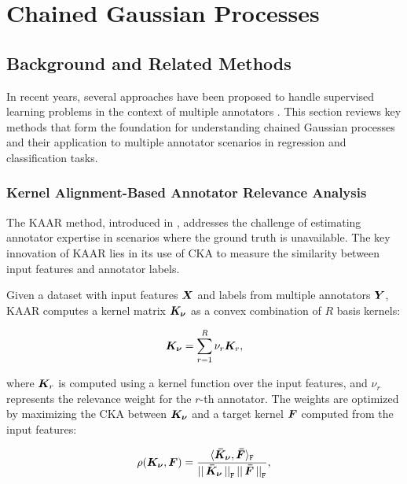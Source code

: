\chapter{Chained Gaussian Processes}\label{ch:chained_gps}

\section{Background and Related Methods}\label{sec:background}

In recent years, several approaches have been proposed to handle
supervised learning problems in the context of multiple annotators
\cite{Yan2014} \cite{Zhang2022}.
This section reviews key methods that form the foundation for
understanding chained Gaussian processes and their application to
multiple annotator scenarios in regression and classification tasks.

\subsection{Kernel Alignment-Based Annotator Relevance Analysis}

The \gls{KAAR} method, introduced in \cite{GilGonzalezEtAl2018},
addresses the challenge of estimating annotator expertise in
scenarios where the ground truth is unavailable. The key innovation
of \gls{KAAR} lies in its use of \gls{CKA} to measure the similarity
between input features and annotator labels.

Given a dataset with input features ${\bm{X}}$ and labels from
multiple annotators ${\bm{Y}}$, \gls{KAAR} computes a kernel matrix
${\bm{K}}_{{\bm{\nu}}}$ as a convex combination of $R$ basis kernels:

\begin{align}
  {\bm{K}}_{{\bm{\nu}}} = \sum_{r=1}^{R}\nu_r{\bm{K}}_{r},
\end{align}

where ${\bm{K}}_{r}$ is computed using a kernel function over the
input features, and $\nu_r$ represents the relevance weight for the
$r$-th annotator. The weights are optimized by maximizing the CKA
between ${\bm{K}}_{{\bm{\nu}}}$ and a target kernel ${\bm{F}}$ computed
from the input features:

\begin{align}
  \rho({\bm{K}}_{{\bm{\nu}}},{\bm{F}}) =
  \frac{{\langle{\bm{\bar{K}_{{\bm{\nu}}}}},{\bm{\bar{F}}}\rangle_{\texttt{F}}}}{{{\left|\right|{\bm{\bar{K}_{{\bm{\nu}}}}}\left|\right|_{\texttt{F}}\left|\right|{\bm{\bar{F}}}\left|\right|_{\texttt{F}}}}},
\end{align}

